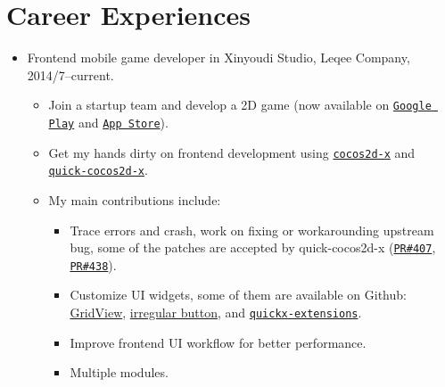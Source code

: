 \documentclass[letterpaper]{article}
\begin{document}
\section*{Career Experiences}
\begin{itemize}
    \item Frontend mobile game developer in Xinyoudi Studio, Leqee Company, 2014/7--current.
        \begin{itemize}
            \item Join a startup team and develop a 2D game (now available on 
                \href{https://play.google.com/store/apps/details?id=com.game168.yysg}{\tt Google Play} and
                \href{https://itunes.apple.com/us/app/ye-ye-san-guo/id976517523?mt=8}{\tt App Store}).
            \item Get my hands dirty on frontend development using \href{http://cocos2d-x.org/}{\tt cocos2d-x} and \href{https://github.com/dualface/v3quick}{\tt quick-cocos2d-x}.
            \item My main contributions include:
                \begin{itemize}
                    \item Trace errors and crash, work on fixing or workarounding upstream bug, some of the patches are accepted by quick-cocos2d-x (\href{https://github.com/dualface/v3quick/pull/407}{\tt PR\#407}, \href{https://github.com/dualface/v3quick/pull/438}{\tt PR\#438}).
                    \item Customize UI widgets, some of them are available on Github: \href{https://github.com/yszheda/cocos2d-x-GridView}{GridView}, \href{https://github.com/yszheda/cocos2d-x-irregular-button}{irregular button}, and \href{https://github.com/yszheda/quickx-extensions}{\tt quickx-extensions}.
                    \item Improve frontend UI workflow for better performance.
                    \item Multiple modules.
                \end{itemize}
        \end{itemize}
\end{itemize}
\end{document}
